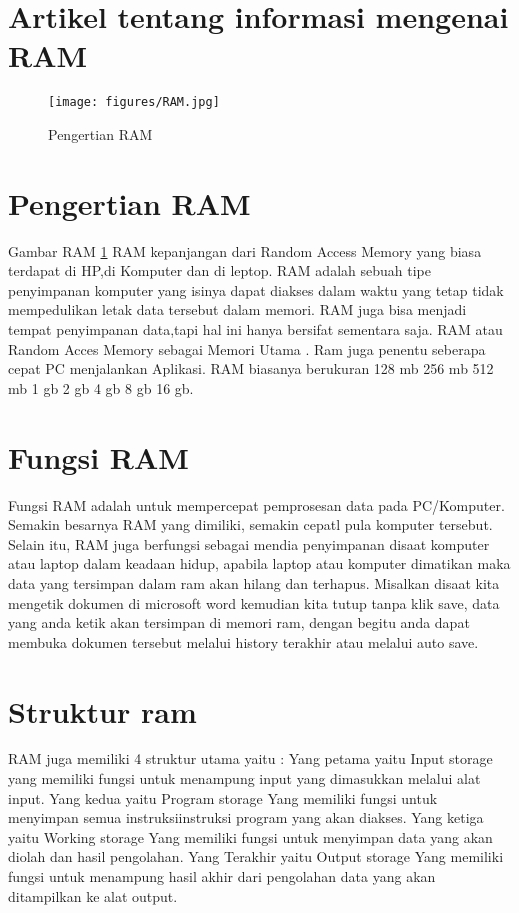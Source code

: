 \section{Artikel tentang informasi mengenai RAM}

  \begin{figure}[ht]
  \centerline{\texttt{[image: figures/RAM.jpg]}}
  \caption{Pengertian RAM}
  \label{RAM}
  \end{figure}

\section{Pengertian RAM}
Gambar RAM \ref{RAM}
RAM kepanjangan dari Random Access Memory yang biasa terdapat di HP,di Komputer dan di leptop.
RAM adalah sebuah tipe penyimpanan komputer yang isinya dapat diakses dalam waktu yang tetap tidak mempedulikan letak data tersebut dalam memori.
RAM juga bisa menjadi tempat penyimpanan data,tapi hal ini hanya bersifat sementara saja.
RAM atau Random Acces Memory sebagai Memori Utama . Ram juga penentu seberapa cepat PC menjalankan Aplikasi.
RAM biasanya berukuran 128 mb 256 mb 512 mb 1 gb 2 gb 4 gb 8 gb 16 gb.

\section{Fungsi RAM}
Fungsi RAM adalah untuk mempercepat pemprosesan data pada PC/Komputer. Semakin besarnya RAM yang dimiliki, semakin cepatl pula komputer tersebut.
Selain itu, RAM juga berfungsi sebagai mendia penyimpanan disaat komputer atau laptop dalam keadaan hidup, apabila laptop atau komputer dimatikan maka data yang tersimpan dalam ram akan hilang dan terhapus. Misalkan disaat kita mengetik dokumen di microsoft word kemudian kita tutup tanpa klik save, data yang anda ketik akan tersimpan di memori ram, dengan begitu anda dapat membuka dokumen tersebut melalui history terakhir atau melalui auto save.

\section{Struktur ram}
RAM juga memiliki 4 struktur utama yaitu :
Yang petama yaitu Input storage yang memiliki fungsi untuk menampung input yang dimasukkan melalui alat input.
Yang kedua yaitu Program storage Yang memiliki fungsi untuk menyimpan semua instruksi\-instruksi program yang akan diakses.
Yang ketiga yaitu Working storage Yang memiliki fungsi untuk menyimpan data yang akan diolah dan hasil pengolahan.
Yang Terakhir yaitu Output storage Yang memiliki fungsi untuk menampung hasil akhir dari pengolahan data yang akan ditampilkan ke alat output.

